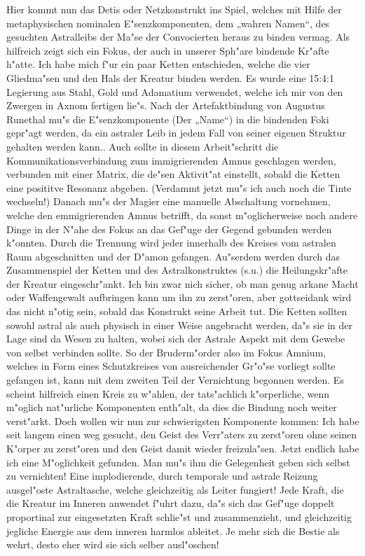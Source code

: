 \documentclass[a5paper,8pt]{book}
\begin{document}
Hier kommt nun das Detis oder Netzkonstrukt ins Spiel, welches mit Hilfe der metaphysischen nominalen E"senzkomponenten, dem „wahren Namen“, des gesuchten Astralleibs der Ma"se der Convocierten heraus zu binden vermag. Als hilfreich zeigt sich ein Fokus, der auch in unserer Sph"are bindende Kr"afte h"atte. Ich habe mich f"ur ein paar Ketten entschieden, welche die vier Gliedma"sen und den Hals der Kreatur binden werden.
Es wurde eine 15:4:1 Legierung aus Stahl, Gold und Adamatium verwendet, welche ich mir von den Zwergen in Axnom fertigen lie"s.
Nach der Artefaktbindung von Augustus Runethal mu"s die E"senzkomponente (Der „Name“) in die bindenden Foki gepr"agt werden, da ein astraler Leib in jedem Fall von seiner eigenen Struktur gehalten werden kann.. Auch sollte in diesem Arbeit"schritt die Kommunikationsverbindung zum immigrierenden Amnus geschlagen werden, verbunden mit einer Matrix, die de"sen Aktivit"at einstellt, sobald die Ketten eine posititve Resonanz abgeben. (Verdammt jetzt mu"s ich auch noch die Tinte wechseln!)
Danach mu"s der Magier eine manuelle Abschaltung vornehmen, welche den emmigrierenden Amnus betrifft, da sonst m"oglicherweise noch andere Dinge in der N"ahe des Fokus an das Gef"uge der Gegend gebunden werden k"onnten.
Durch die Trennung wird jeder innerhalb des Kreises vom astralen Raum abgeschnitten und der D"amon gefangen. Au"serdem werden durch das Zusammenspiel der Ketten und des Astralkonstruktes (s.u.) die Heilungskr"afte der Kreatur eingeschr"ankt. Ich bin zwar nich sicher, ob man genug arkane Macht oder Waffengewalt aufbringen kann um ihn zu zerst"oren, aber gottseidank wird das nicht n"otig sein, sobald das Konstrukt seine Arbeit tut.
Die Ketten sollten sowohl astral als auch physisch in einer Weise angebracht werden, da"s sie in der Lage sind da Wesen zu halten, wobei sich der Astrale Aspekt mit dem Gewebe von selbst verbinden sollte.
So der Bruderm"order also im Fokus Amnium, welches in Form eines Schutzkreises von ausreichender Gr"o"se vorliegt sollte gefangen ist, kann mit dem zweiten Teil der Vernichtung begonnen werden.
Es scheint hilfreich einen Kreis zu w"ahlen, der tats"achlich k"orperliche, wenn m"oglich nat"urliche Komponenten enth"alt, da dies die Bindung noch weiter verst"arkt.
Doch wollen wir nun zur schwierigsten Komponente kommen:
Ich habe seit langem einen weg gesucht, den Geist des Verr"aters zu zerst"oren ohne seinen K"orper zu zerst"oren und den Geist damit wieder freizula"sen. Jetzt endlich habe ich eine M"oglichkeit gefunden. Man mu"s ihm die Gelegenheit geben sich selbst zu vernichten!
Eine implodierende, durch temporale und astrale Reizung ausgel"oste Astraltasche, welche gleichzeitig als Leiter fungiert! Jede Kraft, die die Kreatur im Inneren anwendet f"uhrt dazu, da"s sich das Gef"uge doppelt proportinal zur eingesetzten Kraft schlie"st und zusammenzieht, und gleichzeitig jegliche Energie aus dem inneren harmlos ableitet. Je mehr sich die Bestie als wehrt, desto eher wird sie sich selber ausl"oschen!
\end{document}
